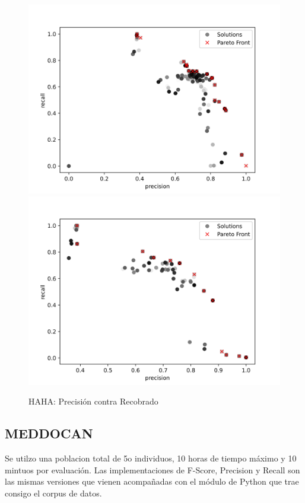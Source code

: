 \begin{figure}[ht]
    \centering
    \includegraphics[scale=0.75]{Pictures/haha_precision_vs_recall.jpg}
    \includegraphics[scale=0.75]{Pictures/haha_precision_vs_recall_3min.jpg}
    \caption{HAHA: Precisi\'on contra Recobrado}
    \label{impl:fig:HAHA:precision_vs_recall}
\end{figure}

\subsection{MEDDOCAN}

Se utilzo una poblacion total de 5o individuos, 10 horas de tiempo m\'aximo y 10 mintuos por  evaluaci\'on. Las implementaciones de F-Score, Precision y Recall son las mismas versiones que vienen acompa\~nadas con el m\'odulo de Python que trae consigo el corpus de datos.

